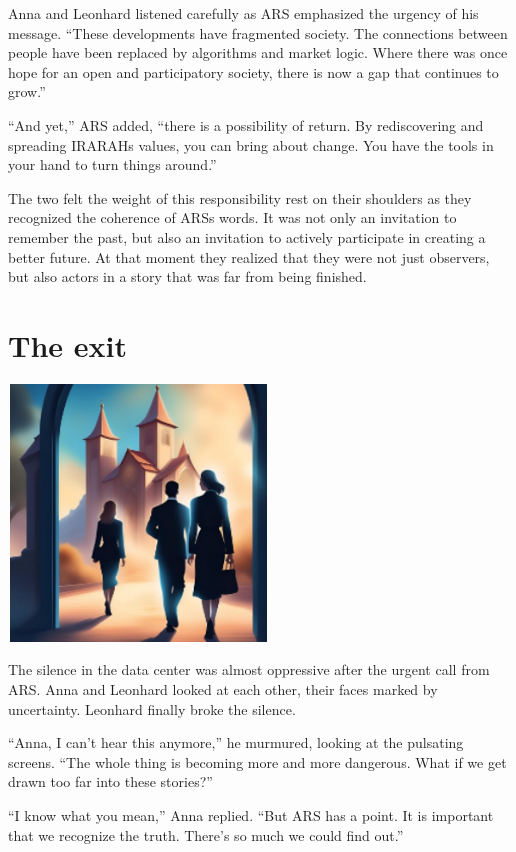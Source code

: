 \documentclass[
]{article}
\begin{document}
Anna and Leonhard listened carefully as ARS emphasized the urgency of
his message. ``These developments have fragmented society. The
connections between people have been replaced by algorithms and market
logic. Where there was once hope for an open and participatory society,
there is now a gap that continues to grow.''

``And yet,'' ARS added, ``there is a possibility of return. By
rediscovering and spreading IRARAH\textquotesingle s values, you can
bring about change. You have the tools in your hand to turn things
around.''

The two felt the weight of this responsibility rest on their shoulders
as they recognized the coherence of ARS\textquotesingle s words. It was
not only an invitation to remember the past, but also an invitation to
actively participate in creating a better future. At that moment they
realized that they were not just observers, but also actors in a story
that was far from being finished.

\section{The exit}\label{the-exit}

\includegraphics[width=2.71875in,height=2.6875in]{media/image5.png}

The silence in the data center was almost oppressive after the urgent
call from ARS. Anna and Leonhard looked at each other, their faces
marked by uncertainty. Leonhard finally broke the silence.

``Anna, I can't hear this anymore,'' he murmured, looking at the
pulsating screens. ``The whole thing is becoming more and more
dangerous. What if we get drawn too far into these stories?''

``I know what you mean,'' Anna replied. ``But ARS has a point. It is
important that we recognize the truth. There's so much we could find
out.''
\end{document}

